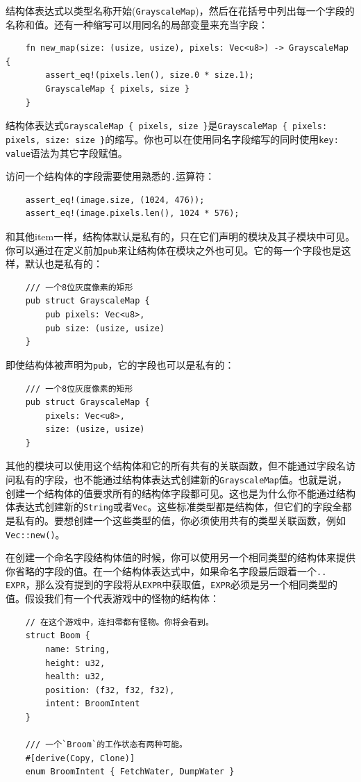 结构体表达式以类型名称开始(\texttt{GrayscaleMap})，然后在花括号中列出每一个字段的名称和值。还有一种缩写可以用同名的局部变量来充当字段：
\begin{verbatim}
    fn new_map(size: (usize, usize), pixels: Vec<u8>) -> GrayscaleMap {
        assert_eq!(pixels.len(), size.0 * size.1);
        GrayscaleMap { pixels, size }
    }
\end{verbatim}

结构体表达式\texttt{GrayscaleMap \{ pixels, size \}}是\texttt{GrayscaleMap \{ pixels: pixels, size: size \}}的缩写。你也可以在使用同名字段缩写的同时使用\texttt{key: value}语法为其它字段赋值。

访问一个结构体的字段需要使用熟悉的\texttt{.}运算符：
\begin{verbatim}
    assert_eq!(image.size, (1024, 476));
    assert_eq!(image.pixels.len(), 1024 * 576);
\end{verbatim}

和其他item一样，结构体默认是私有的，只在它们声明的模块及其子模块中可见。你可以通过在定义前加\texttt{pub}来让结构体在模块之外也可见。它的每一个字段也是这样，默认也是私有的：
\begin{verbatim}
    /// 一个8位灰度像素的矩形
    pub struct GrayscaleMap {
        pub pixels: Vec<u8>,
        pub size: (usize, usize)
    }
\end{verbatim}

即使结构体被声明为\texttt{pub}，它的字段也可以是私有的：
\begin{verbatim}
    /// 一个8位灰度像素的矩形
    pub struct GrayscaleMap {
        pixels: Vec<u8>,
        size: (usize, usize)
    }
\end{verbatim}

其他的模块可以使用这个结构体和它的所有共有的关联函数，但不能通过字段名访问私有的字段，也不能通过结构体表达式创建新的\texttt{GrayscaleMap}值。也就是说，创建一个结构体的值要求所有的结构体字段都可见。这也是为什么你不能通过结构体表达式创建新的\texttt{String}或者\texttt{Vec}。这些标准类型都是结构体，但它们的字段全都是私有的。要想创建一个这些类型的值，你必须使用共有的类型关联函数，例如\texttt{Vec::new()}。

在创建一个命名字段结构体值的时候，你可以使用另一个相同类型的结构体来提供你省略的字段的值。在一个结构体表达式中，如果命名字段最后跟着一个\texttt{.. EXPR}，那么没有提到的字段将从\texttt{EXPR}中获取值，\texttt{EXPR}必须是另一个相同类型的值。假设我们有一个代表游戏中的怪物的结构体：
\begin{verbatim}
    // 在这个游戏中，连扫帚都有怪物。你将会看到。
    struct Boom {
        name: String,
        height: u32,
        health: u32,
        position: (f32, f32, f32),
        intent: BroomIntent
    }

    /// 一个`Broom`的工作状态有两种可能。
    #[derive(Copy, Clone)]
    enum BroomIntent { FetchWater, DumpWater }
\end{verbatim}

